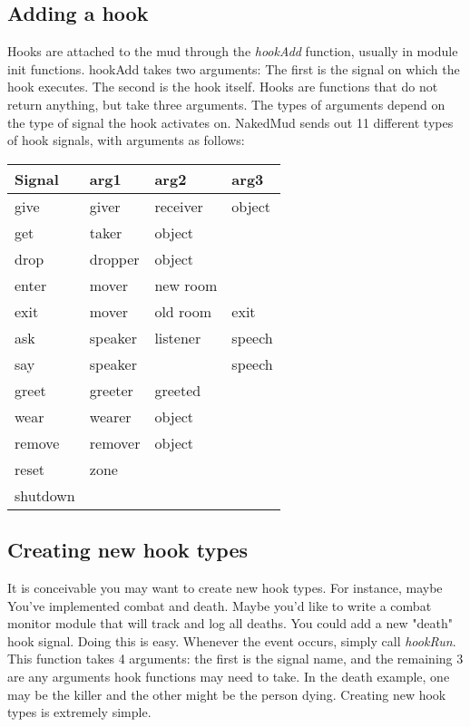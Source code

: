 \documentclass[fignum,doc]{article}
\begin{document}
\begin{doublespace}
\subsection{Adding a hook}
Hooks are attached to the mud through the {\it hookAdd} function, usually in module init functions. hookAdd takes two arguments: The first is the signal on which the hook executes. The second is the hook itself. Hooks are functions that do not return anything, but take three arguments. The types of arguments depend on the type of signal the hook activates on. NakedMud sends out 11 different types of hook signals, with arguments as follows:
\newline \par
\begin{tabular}{|l|l|l|l|}
\hline
Signal & arg1 & arg2 & arg3 \\
\hline
give     & giver   & receiver & object \\ \hline
get      & taker   & object   &        \\ \hline
drop     & dropper & object   &        \\ \hline
enter    & mover   & new room &        \\ \hline
exit     & mover   & old room & exit   \\ \hline
ask      & speaker & listener & speech \\ \hline
say      & speaker &          & speech \\ \hline
greet    & greeter & greeted  &        \\ \hline
wear     & wearer  & object   &        \\ \hline
remove   & remover & object   &        \\ \hline
reset    & zone    &          &        \\ \hline
shutdown &         &          &        \\
\hline
\end{tabular}
\newline \par



\subsection{Creating new hook types}
It is conceivable you may want to create new hook types. For instance, maybe You've implemented combat and death. Maybe you'd like to write a combat monitor module that will track and log all deaths. You could add a new "death" hook signal. Doing this is easy. Whenever the event occurs, simply call {\it hookRun}. This function takes 4 arguments: the first is the signal name, and the remaining 3 are any arguments hook functions may need to take. In the death example, one may be the killer and the other might be the person dying. Creating new hook types is extremely simple.




\end{doublespace}
\end{document}
